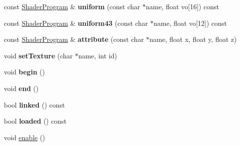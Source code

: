 \begin{DoxyCompactItemize}
\item 
\hypertarget{classvsr_1_1_shader_program_a9014ac5b043599172f83d4f4042ce1a2}{const \hyperlink{classvsr_1_1_shader_program}{Shader\-Program} \& {\bfseries uniform} (const char $\ast$name, float vo\mbox{[}16\mbox{]}) const }\label{classvsr_1_1_shader_program_a9014ac5b043599172f83d4f4042ce1a2}

\item 
\hypertarget{classvsr_1_1_shader_program_aac93c2d1ec8c74085aa119540e59140f}{const \hyperlink{classvsr_1_1_shader_program}{Shader\-Program} \& {\bfseries uniform43} (const char $\ast$name, float vo\mbox{[}12\mbox{]}) const }\label{classvsr_1_1_shader_program_aac93c2d1ec8c74085aa119540e59140f}

\item 
\hypertarget{classvsr_1_1_shader_program_a8af92ad4290b52a1e199bf07c3f1729f}{const \hyperlink{classvsr_1_1_shader_program}{Shader\-Program} \& {\bfseries attribute} (const char $\ast$name, float x, float y, float z)}\label{classvsr_1_1_shader_program_a8af92ad4290b52a1e199bf07c3f1729f}

\item 
\hypertarget{classvsr_1_1_shader_program_acc289f39fbc5b0ec9467a12346bf9193}{void {\bfseries set\-Texture} (char $\ast$name, int id)}\label{classvsr_1_1_shader_program_acc289f39fbc5b0ec9467a12346bf9193}

\item 
\hypertarget{classvsr_1_1_shader_program_acc01c0556404c147a5a75a4aa52e538d}{void {\bfseries begin} ()}\label{classvsr_1_1_shader_program_acc01c0556404c147a5a75a4aa52e538d}

\item 
\hypertarget{classvsr_1_1_shader_program_a471efd95d516105de2e406ba22cff8d2}{void {\bfseries end} ()}\label{classvsr_1_1_shader_program_a471efd95d516105de2e406ba22cff8d2}

\item 
\hypertarget{classvsr_1_1_shader_program_a1d80eda4d7f7de7fdb4d11ec521bf3f9}{bool {\bfseries linked} () const }\label{classvsr_1_1_shader_program_a1d80eda4d7f7de7fdb4d11ec521bf3f9}

\item 
\hypertarget{classvsr_1_1_shader_program_ae825f3bcfb4dcb7ffdc39530bb234f51}{bool {\bfseries loaded} () const }\label{classvsr_1_1_shader_program_ae825f3bcfb4dcb7ffdc39530bb234f51}

\item 
\hypertarget{classvsr_1_1_shader_program_ad0507d18223c3bd42f2133dfc9ff9478}{void \hyperlink{classvsr_1_1_shader_program_ad0507d18223c3bd42f2133dfc9ff9478}{enable} ()}\label{classvsr_1_1_shader_program_ad0507d18223c3bd42f2133dfc9ff9478}


\end{DoxyCompactItemize}
